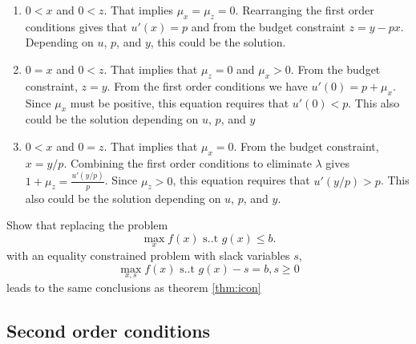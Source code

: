 \begin{example}
\begin{enumerate}
  \item $0 < x$ and $0<z$. That implies $\mu_x = \mu_z =
    0$. Rearranging the first order conditions gives that $u'(x) =
    p$ and from the budget constraint $z = y - p x$. Depending on $u$,
    $p$, and $y$, this could be the solution.
  \item $0 = x$ and $0<z$. That implies that $\mu_z = 0$ and $\mu_x >
    0$. From the budget constraint, $z = y$. From the first order
    conditions we have $u'(0) = p + \mu_x$. Since $\mu_x$ must be
    positive, this equation requires that $u'(0) < p$. This also could
    be the solution depending on $u$, $p$, and $y$
  \item $0 < x$ and $0 = z$. That implies that $\mu_x = 0$. From the
    budget constraint, $x = y/p$. Combining the first order conditions
    to eliminate $\lambda$ gives $1 + \mu_z =
    \frac{u'(y/p)}{p}$. Since $\mu_z>0$, this equation requires that
    $u'(y/p) > p$. This also could be the solution depending on $u$,
    $p$, and $y$.
  \end{enumerate} 
\end{example}

\begin{exercise}
  Show that replacing the problem 
  \[ \max_x f(x) \text{ s..t } g(x) \leq b. \]
  with an equality constrained problem with slack variables $s$, 
  \[ \max_{x,s} f(x) \text{ s..t } g(x) - s = b, s \geq 0 \]
  leads to the same conclusions as theorem \ref{thm:icon}
\end{exercise}


\subsection{Second order conditions} 

